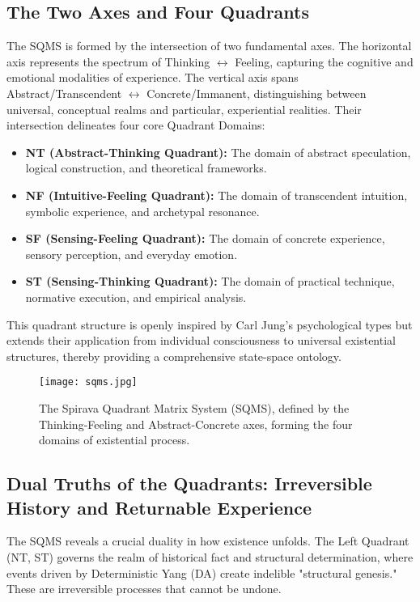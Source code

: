 \documentclass[11pt, a4paper]{article}
\begin{document}
\subsection{The Two Axes and Four Quadrants}
The SQMS is formed by the intersection of two fundamental axes. The horizontal axis represents the spectrum of Thinking $\leftrightarrow$ Feeling, capturing the cognitive and emotional modalities of experience. The vertical axis spans Abstract/Transcendent $\leftrightarrow$ Concrete/Immanent, distinguishing between universal, conceptual realms and particular, experiential realities. Their intersection delineates four core Quadrant Domains:
\begin{itemize}
    \item \textbf{NT (Abstract-Thinking Quadrant):} The domain of abstract speculation, logical construction, and theoretical frameworks.
    \item \textbf{NF (Intuitive-Feeling Quadrant):} The domain of transcendent intuition, symbolic experience, and archetypal resonance.
    \item \textbf{SF (Sensing-Feeling Quadrant):} The domain of concrete experience, sensory perception, and everyday emotion.
    \item \textbf{ST (Sensing-Thinking Quadrant):} The domain of practical technique, normative execution, and empirical analysis.
\end{itemize}
This quadrant structure is openly inspired by Carl Jung’s psychological types but extends their application from individual consciousness to universal existential structures, thereby providing a comprehensive state-space ontology.

\begin{figure}[h!]
    \centering
    \texttt{[image: sqms.jpg]}
    \caption{The Spirava Quadrant Matrix System (SQMS), defined by the Thinking-Feeling and Abstract-Concrete axes, forming the four domains of existential process.}
    \label{fig:sqms}
\end{figure}

\subsection{Dual Truths of the Quadrants: Irreversible History and Returnable Experience}
The SQMS reveals a crucial duality in how existence unfolds. The Left Quadrant (NT, ST) governs the realm of historical fact and structural determination, where events driven by Deterministic Yang (DA) create indelible "structural genesis." These are irreversible processes that cannot be undone.
\end{document}
